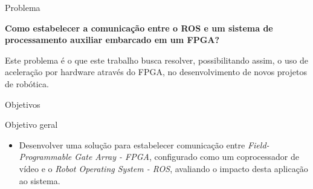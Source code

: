 \documentclass[10pt]{beamer}
\begin{document}
\begin{frame}[fragile]{Problema}
	\begin{center}
		\textbf{Como estabelecer a comunicação entre o ROS e um sistema de processamento auxiliar embarcado em um FPGA? }
	\end{center}

	\vspace{0.75cm}

	Este problema é o que este trabalho busca resolver, possibilitando assim, o uso de aceleração por hardware através do FPGA, no desenvolvimento de novos projetos de robótica.

\end{frame}


{
\begin{frame}{Objetivos}
    \begin{alertblock}{Objetivo geral}
    	\begin{itemize}
    	\item Desenvolver uma solução para estabelecer comunicação entre \textit{Field-Programmable Gate Array - FPGA}, configurado como um coprocessador de vídeo e o \textit{Robot Operating System - ROS}, avaliando o impacto desta aplicação ao sistema.
    	\end{itemize}
    \end{alertblock}
\end{frame}
}
\end{document}
